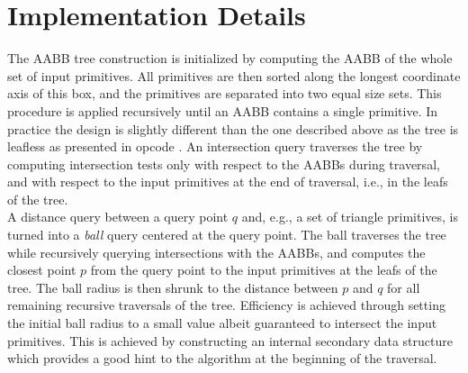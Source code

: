 \section{Implementation Details}
\label{AABB_tree_section_details}

The AABB tree construction is initialized by computing the AABB of the whole set of input primitives. All primitives are then sorted along the longest coordinate axis of this box, and the primitives are separated into two equal size sets. This procedure is applied recursively until an AABB contains a single primitive. In practice the design is slightly different than the one described above as the tree is leafless as presented in {\sc opcode} \cite{cgal:t-ocdl-05}.
An intersection query traverses the tree by computing intersection tests only with respect to the AABBs during traversal, and with respect to the input primitives at the end of traversal, i.e., in the leafs of the tree.\\

A distance query between a query point $q$ and, e.g., a set of triangle primitives, is turned into a \emph{ball} query centered at the query point. The ball traverses the tree while recursively querying intersections with the AABBs, and computes the closest point $p$ from the query point to the input primitives at the leafs of the tree. The ball radius is then shrunk to the distance between $p$ and $q$ for all remaining recursive traversals of the tree. Efficiency is achieved through setting the initial ball radius to a small value albeit guaranteed to intersect the input primitives. This is achieved by constructing an internal secondary data structure which provides a good hint to the algorithm at the beginning of the traversal.
